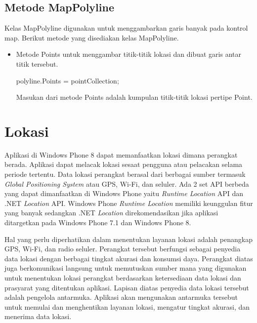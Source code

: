 \subsection{Metode MapPolyline}
\label{subsec:Metode MapPolyline }
\hspace{0.5cm} Kelas MapPolyline digunakan untuk menggambarkan garis banyak pada kontrol map. Berikut metode yang disediakan kelas MapPolyline.
\begin{itemize}
	\item Metode Points untuk menggambar titik-titik lokasi dan dibuat garis antar titik tersebut.
	\begin{center}
			polyline.Points = pointCollection;
	\end{center}	
	Masukan dari metode Points adalah kumpulan titik-titik lokasi pertipe Point.
\end{itemize}


\section{Lokasi}
\label{sec:Lokasi}
\hspace{0.5cm} Aplikasi di Windows Phone 8 dapat memanfaatkan lokasi dimana perangkat berada. Aplikasi dapat melacak lokasi sesaat  pengguna atau pelacakan selama periode tertentu. Data lokasi perangkat berasal dari berbagai sumber termasuk \textit{Global Positioning System} atau GPS, Wi-Fi, dan seluler. Ada 2 set API berbeda yang dapat dimanfaatkan di Windows Phone yaitu \textit{Runtime Location} API dan .NET \textit{Location} API. Windows Phone \textit{Runtime Location} memiliki keunggulan fitur yang banyak sedangkan .NET \textit{Location} direkomendasikan jika aplikasi ditargetkan pada Windows Phone 7.1 dan Windows Phone 8.

\hspace{0.5cm} Hal yang perlu diperhatikan dalam menentukan layanan lokasi adalah penangkap GPS, Wi-Fi, dan radio seluler. Perangkat tersebut berfungsi sebagai penyedia data lokasi dengan berbagai tingkat akurasi dan konsumsi daya. Perangkat diatas juga berkomunikasi langsung untuk memutuskan sumber mana yang digunakan untuk menentukan lokasi perangkat berdasarkan ketersediaan data lokasi dan prasyarat yang ditentukan aplikasi. Lapisan diatas penyedia data lokasi tersebut adalah pengelola antarmuka. Aplikasi akan mengunakan antarmuka tersebut untuk memulai dan menghentikan layanan lokasi, mengatur tingkat akurasi, dan menerima data lokasi.


